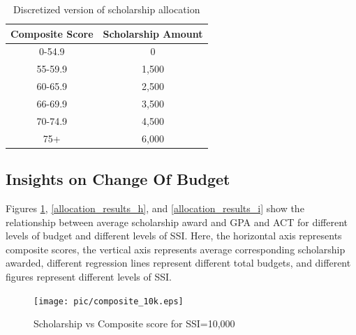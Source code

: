 \documentclass[12pt,english]{report}
\begin{document}

\begin{table}[H]
\centering
\begin{tabular}{|c|c|} \hline
Composite Score & Scholarship Amount \\ \hline
0-54.9         & 0              \\ \hline
55-59.9         & 1,500              \\ \hline
60-65.9         & 2,500              \\ \hline
66-69.9         & 3,500              \\ \hline
70-74.9         & 4,500              \\ \hline
75+             & 6,000              \\ \hline
\end{tabular}
\caption{Discretized version of scholarship allocation}
\label{money_result_discrete}

\end{table}

\subsection{Insights on Change Of Budget}
Figures \ref{allocation_results_g}, \ref{allocation_results_h}, and \ref{allocation_results_i} show the relationship between average scholarship award and GPA and ACT for different levels of budget and different levels of SSI. Here, the horizontal axis represents composite scores, the vertical axis represents average corresponding scholarship awarded, different regression lines represent different total budgets, and different figures represent different levels of SSI.

\begin{figure} [!htbp]
\texttt{[image: pic/composite\_10k.eps]}
\caption{Scholarship vs Composite score for SSI=10,000} \label{allocation_results_g}
\end{figure}
\end{document}
